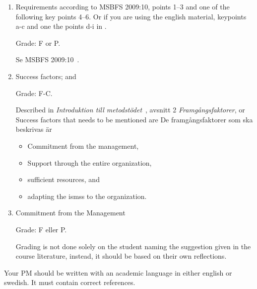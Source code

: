 \documentclass[a4paper]{llncs}
\begin{document}
\begin{enumerate}
  \item Requirements according to MSBFS 2009:10, points 1--3 and one of the
    following key points 4--6. Or if you are using the english material,
    keypoints a-c and one the points d-i in \cite[chap. 3.2.1]{iso27000}.
    \begin{solution}
      Grade: F or P.

      Se MSBFS 2009:10~\cite{MSBFS2009:10}.
    \end{solution}

  \item Success factors; and
    \begin{solution}
      Grade: F-C.

      Described in \emph{Introduktion till metodstödet}~\cite{MSB2011itm}, avsnitt 
      2 \emph{Framgångsfaktorer}, or \cite[3.6]{iso27000}
      Success factors that needs to be mentioned are
      De framgångsfaktorer som ska beskrivas är
      \begin{itemize}
        \item Commitment from the management,
        \item Support through the entire organization,
        \item sufficient resources, and
        \item adapting the \acp{isms} to the organization.
      \end{itemize}
    \end{solution}

  \item Commitment from the Management
    \begin{solution}
      Grade: F eller P.
      
      Grading is not done solely on the student naming the suggestion given in
      the course literature, instead, it should be based on their own
      reflections.
    \end{solution}
\end{enumerate}

Your PM should be written with an academic language in either english or
swedish. It must contain correct references.

\printbibliography{}
\end{document}
